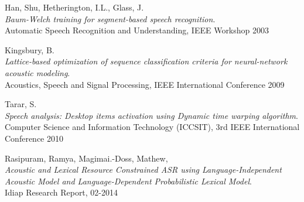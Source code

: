 \begin{thebibliography}{99}
  {\sc Han,} Shu, {\sc Hetherington,} I.L., {\sc Glass,} J.\\
  \emph{Baum-Welch training for segment-based speech recognition}.\\
  Automatic Speech Recognition and Understanding, IEEE Workshop 2003

  {\sc Kingsbury,} B.\\
  \emph{Lattice-based optimization of sequence classification criteria for neural-network acoustic modeling}.\\
  Acoustics, Speech and Signal Processing, IEEE International Conference 2009

  {\sc Tarar,} S.\\
  \emph{Speech analysis: Desktop items activation using Dynamic time warping algorithm}.\\
  Computer Science and Information Technology (ICCSIT), 3rd IEEE International Conference 2010 

  {\sc Rasipuram,} Ramya, {\sc Magimai.-Doss,} Mathew, \\
  \emph{Acoustic and Lexical Resource Constrained ASR using Language-Independent Acoustic Model and Language-Dependent Probabilistic Lexical Model}.\\
  Idiap Research Report, 02-2014

  
\end{thebibliography}
